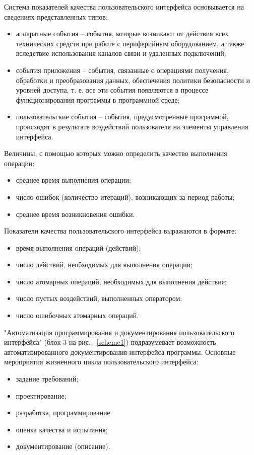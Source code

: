 	Система показателей качества пользовательского интерфейса основывается на сведениях представленных типов:
\begin{itemize}
	\item аппаратные события – события, которые возникают от действия всех технических средств при работе с периферийным оборудованием, а также вследствие использования каналов связи и удаленных подключений;
	\item события приложения – события, связанные с операциями получения, обработки и преобразования данных, обеспечения политики безопасности и уровней доступа, т. е. все эти события появляются в процессе функционирования программы в программной среде;
	\item пользовательские события – события, предусмотренные программой, происходят в результате воздействий пользователя на элементы управления интерфейса.
\end{itemize}

	Величины, с помощью которых можно определить качество выполнения операции:
\begin{itemize}
	\item среднее время выполнения операции; 
	\item число ошибок (количество итераций), возникающих за период работы;
	\item среднее время возникновения ошибки.
\end{itemize}

	Показатели качества пользовательского интерфейса выражаются в формате: 
\begin{itemize}
	\item время выполнения операций (действий); 
	\item число действий, необходимых для выполнения операции; 
	\item число атомарных операций, необходимых для выполнения действия; 
	\item число пустых воздействий, выполненных оператором; 
	\item число ошибочных атомарных операций.
\end{itemize}

	"Автоматизация программирования и документирования пользовательского интерфейса" (блок 3 на рис. ~\ref{scheme1}) подразумевает возможность автоматизированного документирования интерфейса программы.
	Основные мероприятия жизненного цикла пользовательского интерфейса: 
\begin{itemize}
	\item задание требований; 
	\item проектирование; 
	\item разработка, программирование
	\item оценка качества и испытания; 
	\item документирование (описание).
\end{itemize}

